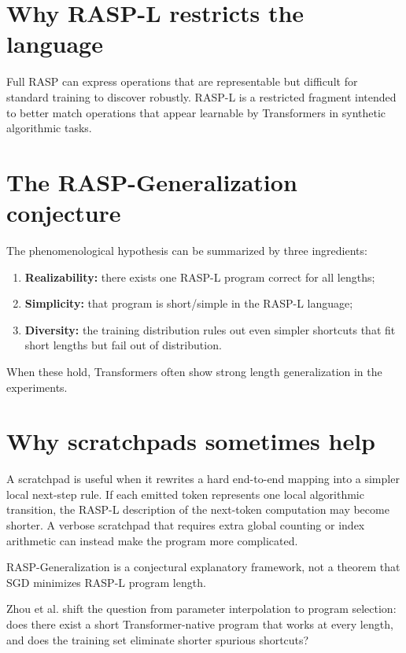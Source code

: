 \documentclass[11pt,a4paper,oneside,openany]{memoir}
\theoremstyle{definition}
\begin{document}
\section{Why RASP-L restricts the language}
Full RASP can express operations that are representable but difficult for standard training to discover robustly.  RASP-L is a restricted fragment intended to better match operations that appear learnable by Transformers in synthetic algorithmic tasks.

\section{The RASP-Generalization conjecture}
The phenomenological hypothesis can be summarized by three ingredients:
\begin{enumerate}
\item \textbf{Realizability:} there exists one RASP-L program correct for all lengths;
\item \textbf{Simplicity:} that program is short/simple in the RASP-L language;
\item \textbf{Diversity:} the training distribution rules out even simpler shortcuts that fit short lengths but fail out of distribution.
\end{enumerate}
When these hold, Transformers often show strong length generalization in the experiments.

\section{Why scratchpads sometimes help}
A scratchpad is useful when it rewrites a hard end-to-end mapping into a simpler local next-step rule.  If each emitted token represents one local algorithmic transition, the RASP-L description of the next-token computation may become shorter.  A verbose scratchpad that requires extra global counting or index arithmetic can instead make the program more complicated.

\begin{warningbox}
RASP-Generalization is a conjectural explanatory framework, not a theorem that SGD minimizes RASP-L program length.
\end{warningbox}

\begin{presentbox}
Zhou et al. shift the question from parameter interpolation to program selection: does there exist a short Transformer-native program that works at every length, and does the training set eliminate shorter spurious shortcuts?
\end{presentbox}
\end{document}
